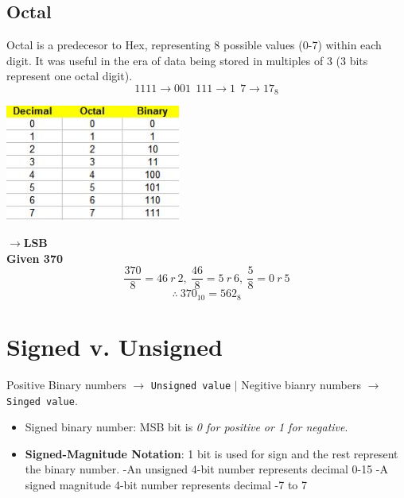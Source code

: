 \documentclass[a4paper,12pt]{article}
\begin{document}
        \subsection*{Octal}
        \begin{minipage}{9cm}
            Octal is a predecesor to Hex, representing 8 possible values (0-7) within each digit. It was useful in the era of data being stored in multiples of 3 (3 bits represent one octal digit).\[1111\rightarrow001~~111\rightarrow1~~7\rightarrow17_8\]  
        \end{minipage}
        \hspace{20pt}
        \begin{minipage}{9cm}
            \includegraphics{Octal table.JPG}
        \end{minipage}
        \vspace{20pt}$\rightarrow$\textbf{LSB}\\\textbf{Given 370} \[\frac{370}{8}=46~r~2,~\frac{46}{8}=5~r~6,~\frac{5}{8}=0~r~5\] \[\therefore~370_{10}=562_8\] \hrulefill
        \section*{Signed v. Unsigned}
            Positive Binary numbers $\rightarrow$ \texttt{Unsigned value} $|$ Negitive bianry numbers $\rightarrow$ \texttt{Singed value}.
                \begin{itemize}
                    \item Signed binary number: MSB bit is \textit{0 for positive or 1 for negative}.
                    \item \textbf{Signed-Magnitude Notation}: 1 bit is used for sign and the rest represent the binary number.
                        \subitem -An unsigned 4-bit number represents decimal 0-15
                        \subitem -A signed magnitude 4-bit number represents decimal -7 to 7
                \end{itemize}
\end{document}
